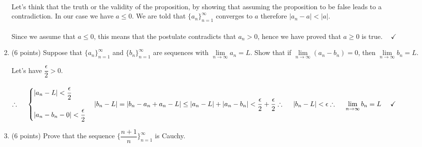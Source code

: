 \documentclass[fleqn]{article}
\begin{document}
\begin{enumerate}
      \textcolor{hwColor}{
        \\
        Let's think that the truth or the validity of the proposition, by showing that assuming the proposition 
        to be false leads to a contradiction. In our case we have $a \leq 0$. We are told that 
        $\{a_n\}_{n=1}^{\infty}$ converges to $a$ therefore $|a_n-a| < |a|$. 
        \\
        \\
        Since we assume that $a \leq 0$, this means that the postulate contradicts that $a_n >0$, hence we have proved that
        $a \geq 0$ is true. $~~~~ \checkmark$
      }

    \pagebreak

    \item (6 points) Suppose that $\{a_n\}_{n=1}^{\infty}$ and $\{b_n\}_{n=1}^{\infty}$ are sequences with $\lim\limits_{n\to\infty} a_n=L$.
    Show that if $\lim\limits_{n\to\infty} (a_n-b_n)=0$, then $\lim\limits_{n\to\infty} b_n=L$.

      \textcolor{hwColor}{
        Let's have $\dfrac{\epsilon}{2}>0$.
        \\
        \\
        $
          \therefore ~~~~ \begin{cases}
            |a_n-L|< \dfrac{\epsilon}{2}
            \\
            \\
            |a_n-b_n-0|< \dfrac{\epsilon}{2}
          \end{cases}
          \\
          \\
          \\
          |b_n-L|=|b_n-a_n+a_n-L| \leq |a_n-L|+|a_n-b_n|< \dfrac{\epsilon}{2}+\dfrac{\epsilon}{2}
          \\
          \\
          \\
          \therefore ~~~~ |b_n-L|<\epsilon
          \\
          \\
          \\
          \therefore ~~~~ \lim\limits_{n\to\infty} b_n=L ~~~~ \checkmark
        $
      }

    \item (6 points) Prove that the sequence $\{\dfrac{n+1}{n}\}_{n=1}^{\infty}$ is Cauchy.


\end{enumerate}
\end{document}

